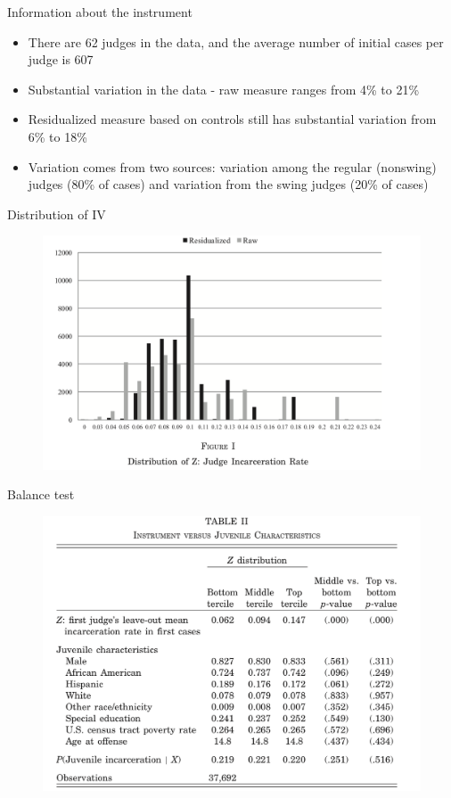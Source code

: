 \documentclass{beamer}
\begin{document}
\begin{frame}{Information about the instrument}

\begin{itemize}
	\item There are 62 judges in the data, and the average number of initial cases per judge is 607
	\item Substantial variation in the data - raw measure ranges from 4\% to 21\%
	\item Residualized measure based on controls still has substantial variation from 6\% to 18\%
	\item Variation comes from two sources: variation among the regular (nonswing) judges (80\% of cases) and variation from the swing judges (20\% of cases)
\end{itemize}

\end{frame}

\begin{frame}{Distribution of IV}
	
	\begin{figure}
	\includegraphics[scale=0.15]{./lecture_includes/iv.png}
	\end{figure}
\end{frame}
	
\begin{frame}{Balance test}
	
	\begin{figure}
	\includegraphics[scale=0.15]{./lecture_includes/balance.png}
	\end{figure}
\end{frame}
\end{document}
